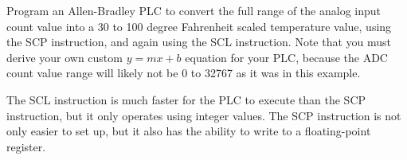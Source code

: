 Program an Allen-Bradley PLC to convert the full range of the analog input count value into a 30 to 100 degree Fahrenheit scaled temperature value, using the SCP instruction, and again using the SCL instruction.  Note that you must derive your own custom $y = mx + b$ equation for your PLC, because the ADC count value range will likely not be 0 to 32767 as it was in this example.







The SCL instruction is much faster for the PLC to execute than the SCP instruction, but it only operates using integer values.  The SCP instruction is not only easier to set up, but it also has the ability to write to a floating-point register.











